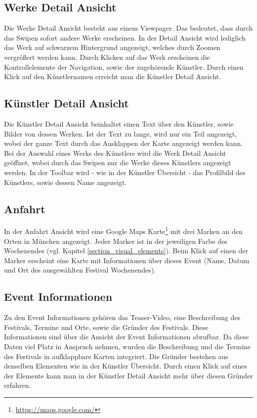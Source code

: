 \subsection{Werke Detail Ansicht}
Die Werke Detail Ansicht besteht aus einem Viewpager. Das bedeutet, dass durch das Swipen sofort andere Werke erscheinen. In der Detail Ansicht wird lediglich das Werk auf schwarzem Hintergrund angezeigt, welches durch Zoomen vergrößert werden kann. Durch Klicken auf das Werk erscheinen die Kontrollelemente der Navigation, sowie der zugehörende Künstler. Durch einen Klick auf den Künstlernamen erreicht man die Künstler Detail Ansicht.

\subsection{Künstler Detail Ansicht}
Die Künstler Detail Ansicht beinhaltet einen Text über den Künstler, sowie Bilder von dessen Werken. Ist der Text zu lange, wird nur ein Teil angezeigt, wobei der ganze Text durch das Ausklappen der Karte angezeigt werden kann. Bei der Auswahl eines Werks des Künstlers wird die Werk Detail Ansicht geöffnet, wobei durch das Swipen nur die Werke dieses Künstlers angezeigt werden. In der Toolbar wird - wie in der Künstler Übersicht - das Profilbild des Künstlers, sowie dessen Name angezeigt. 

\subsection{Anfahrt}
In der Anfahrt Ansicht wird eine Google Maps Karte\footnote{\url{https://maps.google.com/}} mit drei Marken an den Orten in München angezeigt. Jeder Marker ist in der jeweiligen Farbe des Wochenendes (vgl. Kapitel \ref{section_visual_elements}). Beim Klick auf einen der Marker erscheint eine Karte mit Informationen über dieses Event (Name, Datum und Ort des ausgewählten Festival Wochenendes). 

\subsection{Event Informationen}
Zu den Event Informationen gehören das Teaser-Video, eine Beschreibung des Festivals, Termine und Orte, sowie die Gründer des Festivals. Diese Informationen sind über die Ansicht der Event Informationen abrufbar. Da diese Daten viel Platz in Anspruch nehmen, wurden die Beschreibung und die Termine des Festivals in aufklappbare Karten integriert. Die Gründer bestehen aus denselben Elementen wie in der Künstler Übersicht. Durch einen Klick auf eines der Elemente kann man in der Künstler Detail Ansicht mehr über diesen Gründer erfahren.


